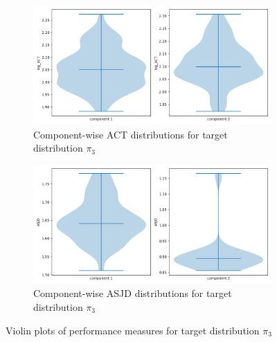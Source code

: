 \documentclass{scrartcl}
\begin{document}
    \begin{figure}
        \centering
        \begin{subfigure}{0.42\textheight}
              \centering
              \includegraphics[width=.8\linewidth]{../figs/log_ACT_pi_3.png}
              \caption{Component-wise ACT distributions for target distribution $\pi_3$}
              \label{violin_plots_pi_3_act}
        \end{subfigure}
        \begin{subfigure}{0.42\textheight}
              \centering
              \includegraphics[width=.8\linewidth]{../figs/ASJD_pi_3.png}
              \caption{Component-wise ASJD distributions for target distribution $\pi_3$}
              \label{violin_plots_pi_3_asjd}
        \end{subfigure}
        \caption{Violin plots of performance measures for target distribution $\pi_3$}
        \label{violin_plots_pi_3}
    \end{figure}
\end{document}
